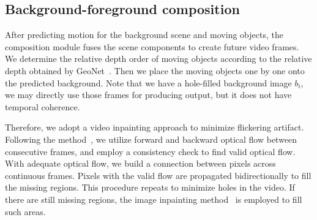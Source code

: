 \documentclass[10pt,twocolumn,letterpaper]{article}
\begin{document}
\subsection{Background-foreground composition}
After predicting motion for the background scene and moving objects, the composition module fuses the scene components to create future video frames. We determine the relative depth order of moving objects according to the relative depth obtained by GeoNet~\cite{yin2018geonet}. Then we place the moving objects one by one onto the predicted background. Note that we have a hole-filled background image $b_i$, we may directly use those frames for producing output, but it does not have temporal coherence. 

Therefore, we adopt a video inpainting approach to minimize flickering artifact. Following the method~\cite{Xu_2019_CVPR}, we utilize forward and backward optical flow between consecutive frames, and employ a consistency check to find valid optical flow. With adequate optical flow, we build a connection between pixels across continuous frames. Pixels with the valid flow are propagated bidirectionally to fill the missing regions. 
This procedure repeats to minimize holes in the video. If there are still missing regions, the image inpainting method~\cite{yu2018generative} is employed to fill such areas. 
\end{document}
